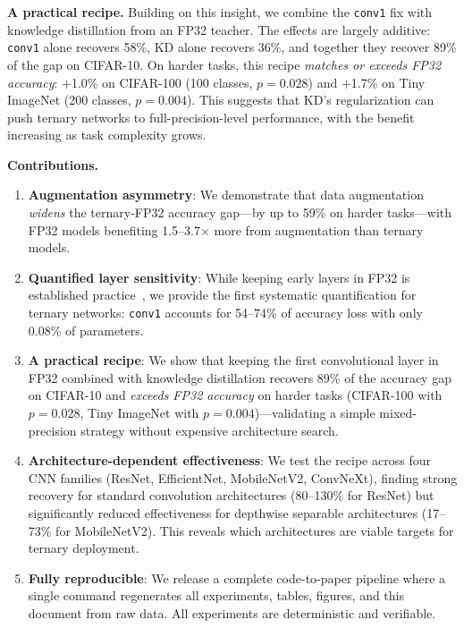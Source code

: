 \documentclass[10pt]{article}
\begin{document}
\textbf{A practical recipe.} Building on this insight, we combine the \texttt{conv1} fix with knowledge distillation from an FP32 teacher. The effects are largely additive: \texttt{conv1} alone recovers 58\%, KD alone recovers 36\%, and together they recover 89\% of the gap on CIFAR-10. On harder tasks, this recipe \emph{matches or exceeds FP32 accuracy}: +1.0\% on CIFAR-100 (100 classes, $p=0.028$) and +1.7\% on Tiny ImageNet (200 classes, $p=0.004$). This suggests that KD's regularization can push ternary networks to full-precision-level performance, with the benefit increasing as task complexity grows.

\textbf{Contributions.}
\begin{enumerate}
    \item \textbf{Augmentation asymmetry}: We demonstrate that data augmentation \emph{widens} the ternary-FP32 accuracy gap---by up to 59\% on harder tasks---with FP32 models benefiting 1.5--3.7$\times$ more from augmentation than ternary models.
    \item \textbf{Quantified layer sensitivity}: While keeping early layers in FP32 is established practice~\cite{rastegari2016xnornet,zhou2016dorefa}, we provide the first systematic quantification for \bitnetb{} ternary networks: \texttt{conv1} accounts for 54--74\% of accuracy loss with only 0.08\% of parameters.
    \item \textbf{A practical recipe}: We show that keeping the first convolutional layer in FP32 combined with knowledge distillation recovers 89\% of the accuracy gap on CIFAR-10 and \emph{exceeds FP32 accuracy} on harder tasks (CIFAR-100 with $p=0.028$, Tiny ImageNet with $p=0.004$)---validating a simple mixed-precision strategy without expensive architecture search.
    \item \textbf{Architecture-dependent effectiveness}: We test the recipe across four CNN families (ResNet, EfficientNet, MobileNetV2, ConvNeXt), finding strong recovery for standard convolution architectures (80--130\% for ResNet) but significantly reduced effectiveness for depthwise separable architectures (17--73\% for MobileNetV2). This reveals which architectures are viable targets for ternary deployment.
    \item \textbf{Fully reproducible}: We release a complete code-to-paper pipeline where a single command regenerates all experiments, tables, figures, and this document from raw data. All experiments are deterministic and verifiable.
\end{enumerate}
\end{document}
